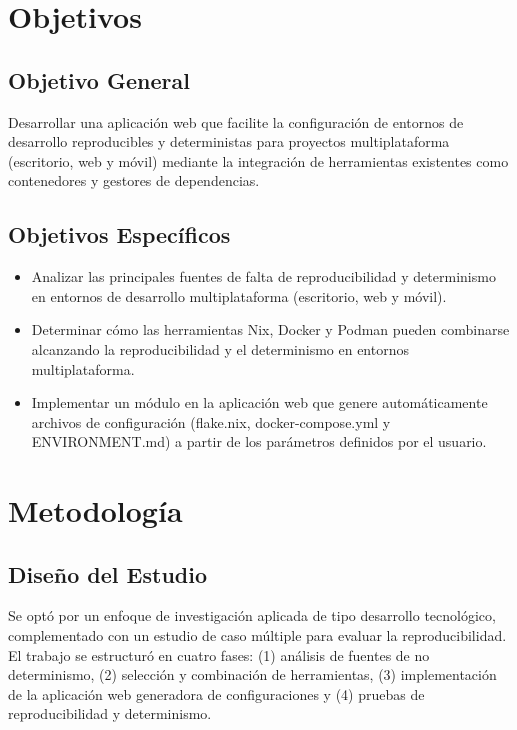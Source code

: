 \documentclass[stu,]{apa7} %
\begin{document}
\section{Objetivos}

\subsection{Objetivo General}
Desarrollar una aplicación web que facilite la configuración de entornos de desarrollo reproducibles y deterministas para proyectos multiplataforma (escritorio, web y móvil) mediante la integración de herramientas existentes como contenedores y gestores de dependencias.


\subsection{Objetivos Específicos}

\begin{itemize}
  \item Analizar las principales fuentes de falta de reproducibilidad y determinismo en entornos de desarrollo multiplataforma (escritorio, web y móvil).

  \item Determinar cómo las herramientas Nix, Docker y Podman pueden combinarse alcanzando la reproducibilidad y el determinismo en entornos multiplataforma.
  \item Implementar un módulo en la aplicación web que genere automáticamente archivos de configuración (flake.nix, docker-compose.yml y ENVIRONMENT.md) a partir de los parámetros definidos por el usuario.


\end{itemize}

\section{Metodología}

\subsection{Diseño del Estudio}

Se optó por un enfoque de investigación aplicada de tipo desarrollo tecnológico, complementado con un estudio de caso múltiple para evaluar la reproducibilidad. El trabajo se estructuró en cuatro fases: (1) análisis de fuentes de no determinismo, (2) selección y combinación de herramientas, (3) implementación de la aplicación web generadora de configuraciones y (4) pruebas de reproducibilidad y determinismo.
\end{document}
